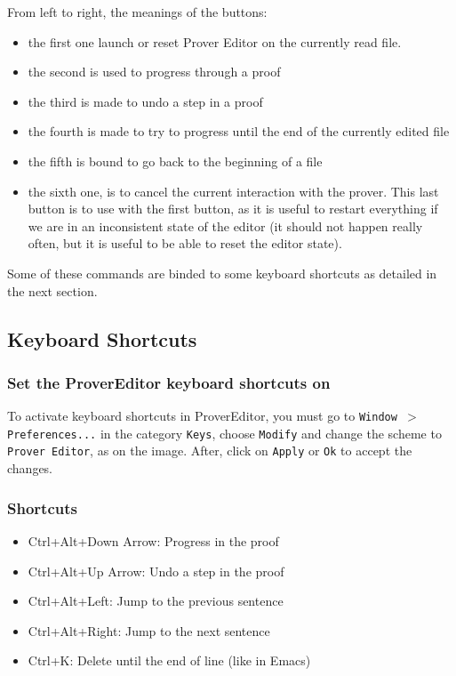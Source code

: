 \documentclass[a4paper]{article}
\begin{document}
From left to right, the meanings of the buttons: 
\begin{itemize}
\item the first one launch or reset Prover Editor on the currently read file. 
\item the second is used to progress through a proof
\item the third is made to undo a step in a proof
\item the fourth is made to try to progress until the end of the 
currently edited file
\item the fifth is bound to go back to the beginning of a file
\item the sixth one, is to cancel the current interaction with the 
prover. This last button is to use with the first button, as it is useful
to restart everything if we are in an inconsistent state of the editor
(it should not happen really often, but it is useful to be able to 
reset the editor state).
\end{itemize}
Some of these commands are binded to some keyboard shortcuts as detailed
in the next section.
\subsection{Keyboard Shortcuts}
\subsubsection{Set the ProverEditor keyboard shortcuts on}
To activate keyboard shortcuts in ProverEditor, you must go to
{\tt Window $>$ Preferences...} in the category {\tt Keys}, choose 
{\tt Modify} and change the scheme to {\tt Prover Editor}, as on the image. 
After, click on {\tt Apply} or {\tt Ok} to accept the changes.



\subsubsection{Shortcuts}
\begin{itemize}
\item Ctrl+Alt+Down Arrow: Progress in the proof
\item Ctrl+Alt+Up Arrow: Undo a step in the proof
\item Ctrl+Alt+Left: Jump to the previous sentence
\item Ctrl+Alt+Right: Jump to the next sentence
\item Ctrl+K: Delete until the end of line (like in Emacs)
\end{itemize}
\end{document}

